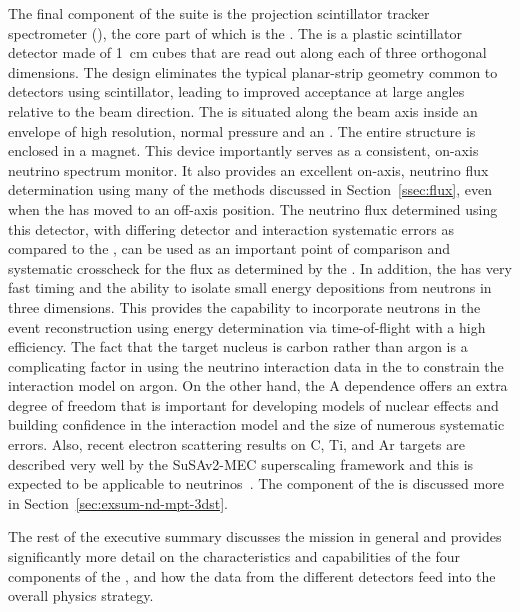 The final component of the   suite is the \threed projection scintillator tracker spectrometer (),  the core part of which is the .  The  is a plastic scintillator detector made of \SI{1}{cm} cubes that are read out along each of three orthogonal dimensions.  The design eliminates the typical planar-strip geometry common to detectors using scintillator, leading to improved acceptance at large angles relative to the beam direction.  The  is situated along the beam axis inside an envelope of high resolution, normal pressure  and an .  The entire structure is enclosed in a magnet. This device importantly serves as a consistent, on-axis neutrino spectrum monitor.   It also provides an excellent on-axis, neutrino flux determination using many of the methods discussed in Section~\ref{ssec:flux}, even when the  has moved to an off-axis position.  The neutrino flux determined using this detector, with  differing detector and interaction systematic errors as compared to the , can be used as an important point of comparison and systematic crosscheck for the flux as determined by the .
In addition, the  has very fast timing and the ability to isolate small energy depositions from neutrons in three dimensions.  This provides the capability to  incorporate neutrons in the event reconstruction using energy determination via time-of-flight with a high efficiency.  
The fact that the target nucleus is carbon rather than argon is a complicating factor in using the neutrino interaction data in the  to constrain the interaction model on argon.  
On the other hand, the A dependence offers an extra degree of freedom that is important for developing models of nuclear effects and building confidence in the interaction model and the size of numerous systematic errors.  Also, recent electron scattering results on C, Ti, and Ar targets are described very well by the SuSAv2-MEC superscaling framework and this is expected to be applicable to neutrinos~\cite{Barbaro:2019vsr}.  The  component of the  is discussed more in Section~\ref{sec:exsum-nd-mpt-3dst}.


The rest of the  executive summary discusses the  mission in general and provides significantly more detail on the characteristics and capabilities of the four components of the , and how the data from the different detectors feed into the overall  physics strategy. 


